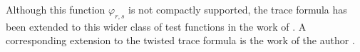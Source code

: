 \documentclass[11pt]{amsart}
\theoremstyle{remark}
\begin{document}
Although this function $\varphi_{r, s}$ is not compactly supported, the trace formula has been extended to this wider class of test functions in the work of \cite{FL16, FLM}. A corresponding extension to the twisted trace formula is the work of the author \cite{Par19}. 









\end{document}
